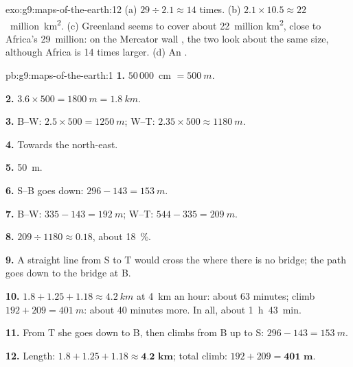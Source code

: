\begin{solution}{exo:g9:maps-of-the-earth:12}
(a) $29 \div 2.1 \approx 14$ times. (b) $2.1 \times 10.5 \approx
22$~million~\unit{km^2}. (c) Greenland seems to cover about 22~million
\unit{km^2}, close to Africa's 29~million: on the Mercator wall , the two
look about the same size, although Africa is 14 times larger. (d) An
.
\end{solution}

\begin{solution}{pb:g9:maps-of-the-earth:1}
\textbf{1.} $50\,000$~cm $= \qty{500}{m}$.

\textbf{2.} $3.6 \times 500 = \qty{1800}{m} = \qty{1.8}{km}$.

\textbf{3.} B--W: $2.5 \times 500 = \qty{1250}{m}$; W--T: $2.35 \times 500
\approx \qty{1180}{m}$.

\textbf{4.} Towards the north-east.

\textbf{5.} \qty{50}{m}.

\textbf{6.} S--B goes down: $296 - 143 = \qty{153}{m}$.

\textbf{7.} B--W: $335 - 143 = \qty{192}{m}$; W--T: $544 - 335 =
\qty{209}{m}$.

\textbf{8.} $209 \div 1180 \approx 0.18$, about \qty{18}{\%}.

\textbf{9.} A straight line from S to T would cross the  where there
is no bridge; the path goes down to the bridge at B.

\textbf{10.} $1.8 + 1.25 + 1.18 \approx \qty{4.2}{km}$ at \qty{4}{km} an
hour: about 63 minutes; climb $192 + 209 = \qty{401}{m}$: about 40 minutes
more. In all, about 1~h~43~min.

\textbf{11.} From T she goes down to B, then climbs from B up to S: $296 -
143 = \qty{153}{m}$.

\textbf{12.} Length: $1.8 + 1.25 + 1.18 \approx \textbf{4.2 km}$; total
climb: $192 + 209 = \textbf{401 m}$.
\end{solution}
